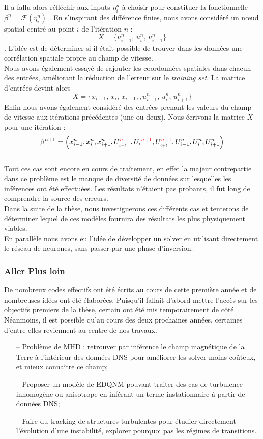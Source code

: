 \documentclass[a4paper,12pt]{article}
\newcommand{\bepar}[1]{
	\left( #1 \right)  
}
\newcommand\bk{\color{black}}
\newcommand\dsb{\color{dsb}}
\newcommand\red{\color{red}}
\numberwithin{equation}{section} %
\begin{document}
\noindent Il a fallu alors réfléchir aux inputs $\eta_i^n$ à choisir pour constituer la fonctionnelle $\beta^n = \mathcal{F}\bepar{\eta_i^n}$ . En s'inspirant des différence finies, nous avons considéré un nœud spatial centré au point $i$ de l'itération $n$ : $$X = \{ u^n_{i-1},\, u^n_{i},\, u^n_{i+1}\}$$. L'idée est de déterminer si il était possible de trouver dans les données une corrélation spatiale propre au champ de vitesse.\\
Nous avons également essayé de rajouter les coordonnées spatiales dans chacun des entrées, améliorant la réduction de l'erreur sur le \textit{training set}. La matrice d'entrées devint alors $$X = \{ x_{i-1}, \, x_i,\, x_{i+1},, u^n_{i-1},\, u^n_{i},\, u^n_{i+1}\}$$
Enfin nous avons également considéré des entrées prenant les valeurs du champ de vitesse aux itérations précédentes (une ou deux). Nous écrivons la matrice $X$ pour une itération : $$ \beta^{n+1} = \bepar{x_{i-1}^n, x_i^n, x^n_{i+1}, U_{_{\bk i-1}}^{\red n-1}, U_{\bk i}^{\red n-1}, U_{_{\bk i+1}}^{\red n-1}, U_{i-1}^n, U_i^n, U^n_{i+1}} $$\\
Tout ces cas sont encore en cours de traîtement, en effet la majeur contrepartie dans ce problème est le manque de diversité de données sur lesquelles les inférences ont été effectuées. Les résultats n'étaient pas probants, il fut long de comprendre la source des erreurs. \\
Dans la suite de la thèse, nous investiguerons ces différents cas et tenterons de déterminer lequel de ces modèles fournira des résultats les plus physiquement viables.\\
En parallèle nous avons eu l'idée de développer un solver en utilisant directement le réseau de neurones, sans passer par une phase d'inversion.\\

\dsb \subsubsection{Aller Plus loin} \bk
\noindent De nombreux codes effectifs ont été écrits au cours de cette première année et de nombreuses idées ont été élaborées. Puisqu'il fallait d'abord mettre l'accès sur les objectifs premiers de la thèse, certain ont été mis temporairement de côté.\\
 Néanmoins, il est possible qu'au cours des deux prochaines années, certaines d'entre elles reviennent au centre de nos travaux.
 \begin{itemize}[leftmargin=1cm]
 \item[--] Problème de MHD : retrouver par inférence le champ magnétique de la Terre à l'intérieur des données DNS pour améliorer les solver moins coûteux, et mieux connaître ce champ;
 \item[--] Proposer un modèle de EDQNM pouvant traiter des cas de turbulence inhomogène ou anisotrope en inférant un terme instationnaire à partir de données DNS;
 \item[--] Faire du tracking de structures turbulentes pour étudier directement l'évolution d'une instabilité, explorer pourquoi pas les régimes de transitions.
 \end{itemize}
\end{document}
